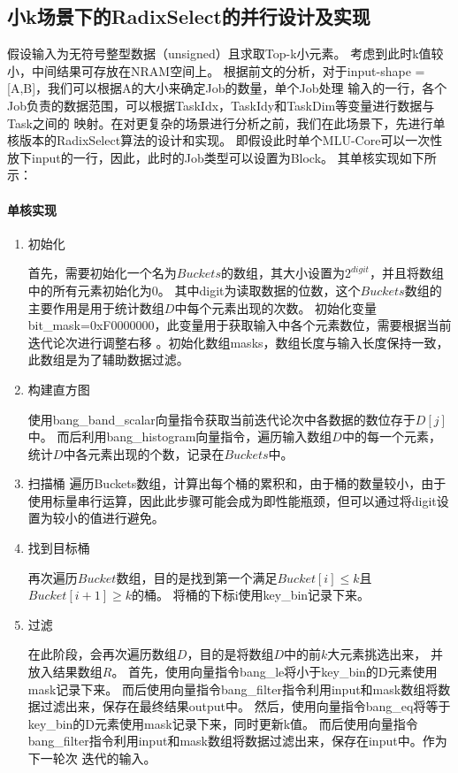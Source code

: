 \subsection{小k场景下的RadixSelect的并行设计及实现}
假设输入为无符号整型数据（unsigned）且求取Top-k小元素。
考虑到此时k值较小，中间结果可存放在NRAM空间上。
  根据前文的分析，对于input-shape = [A,B]，我们可以根据A的大小来确定Job的数量，单个Job处理
  输入的一行，各个Job负责的数据范围，可以根据TaskIdx，TaskIdy和TaskDim等变量进行数据与Task之间的
  映射。在对更复杂的场景进行分析之前，我们在此场景下，先进行单核版本的RadixSelect算法的设计和实现。
  即假设此时单个MLU-Core可以一次性放下input的一行，因此，此时的Job类型可以设置为Block。
  其单核实现如下所示：
  \paragraph{单核实现}
\begin{enumerate}
\item {初始化}

  首先，需要初始化一个名为\(Buckets\)的数组，其大小设置为\(2^{digit}\)，并且将数组中的所有元素初始化为\(0\)。
  其中digit为读取数据的位数，这个\(Buckets\)数组的主要作用是用于统计数组\(D\)中每个元素出现的次数。
  初始化变量bit\_mask=0xF0000000，此变量用于获取输入中各个元素数位，需要根据当前迭代论次进行调整右移
  。初始化数组masks，数组长度与输入长度保持一致，此数组是为了辅助数据过滤。
  \item {构建直方图}

使用bang\_band\_scalar向量指令获取当前迭代论次中各数据的数位存于\(D[j]\)中。
而后利用bang\_histogram向量指令，遍历输入数组\(D\)中的每一个元素，统计\(D\)中各元素出现的个数，记录在\(Buckets\)中。
\item {扫描桶}
遍历Buckets数组，计算出每个桶的累积和，由于桶的数量较小，由于使用标量串行运算，因此此步骤可能会成为即性能瓶颈，但可以通过将digit设置为较小的值进行避免。

\item {找到目标桶}

再次遍历\(Bucket\)数组，目的是找到第一个满足\(Bucket[i] \le k\)且\(Bucket[i+1] \geq k\)的桶。
将桶的下标i使用key\_bin记录下来。

\item{过滤}

  在此阶段，会再次遍历数组\(D\)，目的是将数组\(D\)中的前\(k\)大元素挑选出来，
  并放入结果数组\(R\)。
  首先，使用向量指令bang\_le将小于key\_bin的D元素使用mask记录下来。
  而后使用向量指令bang\_filter指令利用input和mask数组将数据过滤出来，保存在最终结果output中。
  然后，使用向量指令bang\_eq将等于key\_bin的D元素使用mask记录下来，同时更新k值。
  而后使用向量指令bang\_filter指令利用input和mask数组将数据过滤出来，保存在input中。作为下一轮次
  迭代的输入。

\end{enumerate}

